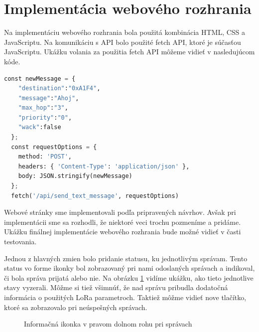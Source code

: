 \documentclass[slovak,master]{diploma}
\begin{document}
\section{Implementácia webového rozhrania}
Na implementáciu webového rozhrania bola použitá kombinácia HTML, CSS a JavaScriptu. Na komunikáciu s API bolo použité fetch API, 
ktoré je súčasťou JavaScriptu. Ukážku volania za použitia fetch API môžeme vidieť v nasledujúcom kóde.
\newpage
\begin{lstlisting}[language=Python, label={lst:fetch}]
  const newMessage = {
    "destination":"0xA1F4",
    "message":"Ahoj",
    "max_hop":"3",
    "priority":"0",
    "wack":false
  };
  const requestOptions = {
    method: 'POST',
    headers: { 'Content-Type': 'application/json' },
    body: JSON.stringify(newMessage)
  };
  fetch('/api/send_text_message', requestOptions)
\end{lstlisting}

Webové stránky sme implementovali podľa pripravených návrhov. Avšak pri implementácii sme sa rozhodli, že 
niektoré veci trochu pozmeníme a pridáme. Ukážku finálnej implementácie webového rozhrania bude možné vidieť v časti testovania.

Jednou z hlavných zmien bolo pridanie statusu, ku jednotlivým správam. 
Tento status vo forme ikonky bol zobrazovaný pri nami odoslaných správach a indikoval, či bola správa prijatá alebo nie. 
Na obrázku \ref{fig:messageStates} vidíme ukážku, ako tieto jednotlive stavy vyzerali. Môžme si tiež všimnúť, že nad správu 
pribudla dodatočná informácia o použitých LoRa parametroch. Taktiež môžme vidieť nove tlačítko, ktoré sa zobrazovalo pri 
neúspešných správach.

\begin{figure}[h!]
  \centering
  \newline
  \caption{Informačná ikonka v pravom dolnom rohu pri správach}
  \label{fig:messageStates}
\end{figure}
\end{document}
